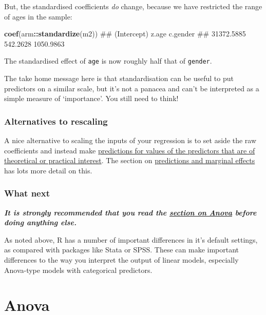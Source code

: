 \documentclass[]{article}
\newenvironment{Shaded}{\begin{snugshade}}{\end{snugshade}}
\newcommand{\KeywordTok}[1]{\textcolor[rgb]{0.13,0.29,0.53}{\textbf{#1}}}
\newcommand{\OperatorTok}[1]{\textcolor[rgb]{0.81,0.36,0.00}{\textbf{#1}}}
\newcommand{\NormalTok}[1]{#1}
\theoremstyle{definition}
\theoremstyle{definition}
\theoremstyle{definition}
\theoremstyle{remark}
\begin{document}
But, the standardised coefficients \emph{do} change, because we have
restricted the range of ages in the sample:

\begin{Shaded}
\begin{Highlighting}[]
\KeywordTok{coef}\NormalTok{(arm}\OperatorTok{::}\KeywordTok{standardize}\NormalTok{(m2))}
\NormalTok{## (Intercept)       z.age    c.gender }
\NormalTok{##  31372.5885    542.2628   1050.9863}
\end{Highlighting}
\end{Shaded}

The standardised effect of \texttt{age} is now roughly half that of
\texttt{gender}.

{The take home message here is that standardisation can be useful to put
predictors on a similar scale, but it's not a panacea and can't be
interpreted as a simple measure of `importance'. You still need to
think!}

\subsubsection*{Alternatives to
rescaling}\label{alternatives-to-rescaling}

A nice alternative to scaling the inputs of your regression is to set
aside the raw coefficients and instead make
\protect\hyperlink{predictions-and-margins}{predictions for values of
the predictors that are of theoretical or practical interest}. The
section on \protect\hyperlink{predictions-and-margins}{predictions and
marginal effects} has lots more detail on this.

\subsubsection*{What next}\label{what-next}

\textbf{\emph{It is strongly recommended that you read the
\href{anova.html}{section on Anova} before doing anything else.}}

As noted above, R has a number of important differences in it's default
settings, as compared with packages like Stata or SPSS. These can make
important differences to the way you interpret the output of linear
models, especially Anova-type models with categorical predictors.

\hypertarget{anova}{\section{Anova}\label{anova}}
\end{document}
